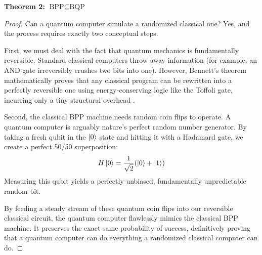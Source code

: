 \textbf{Theorem 2:} $\text{BPP} \subseteq \text{BQP}$
\begin{proof}
Can a quantum computer simulate a randomized classical one? Yes, and the process requires exactly two conceptual steps.

First, we must deal with the fact that quantum mechanics is fundamentally reversible. 
Standard classical computers throw away information (for example, an AND gate irreversibly crushes two bits into one). 
However, Bennett's theorem mathematically proves that any classical program can be rewritten into a perfectly reversible one using energy-conserving logic like the Toffoli gate, incurring only a tiny structural overhead \cite{bennett1973}. 

Second, the classical BPP machine needs random coin flips to operate. 
A quantum computer is arguably nature's perfect random number generator. 
By taking a fresh qubit in the $\ket{0}$ state and hitting it with a Hadamard gate, we create a perfect 50/50 superposition:
\bigskip
\begin{equation}
    H\ket{0} = \frac{1}{\sqrt{2}}(\ket{0} + \ket{1})
\end{equation}
\bigskip
Measuring this qubit yields a perfectly unbiased, fundamentally unpredictable random bit. 

By feeding a steady stream of these quantum coin flips into our reversible classical circuit, the quantum computer flawlessly mimics the classical BPP machine. 
It preserves the exact same probability of success, definitively proving that a quantum computer can do everything a randomized classical computer can do.
\end{proof}

